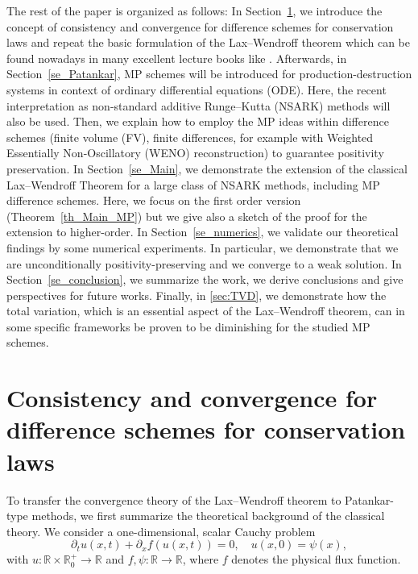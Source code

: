 \documentclass[final,11pt, times, linenumber, nopreprintline]{elsarticle}
\newcommand{\TI}[1]{{\color{red}#1}}
\newcommand{\PO}[1]{{\color{blue}#1}}
\newcommand{\R}{\mathbb{R}}
\newcommand{\bu}{ u}
\begin{document}
The rest of the paper is organized as follows: In Section~\ref{Se_preliminaries}, we introduce the concept of consistency and convergence for difference schemes for conservation laws and repeat the basic formulation of the Lax--Wendroff theorem which can be found nowadays in many excellent lecture books like \cite{leveque_numerical_1992, kroner_numerical_1997,godlewski_numerical_1996}.
Afterwards, in Section~\ref{se_Patankar}, MP schemes will be introduced for production-destruction systems in context of ordinary differential equations (ODE). Here, the recent interpretation as  non-standard additive Runge--Kutta (NSARK) methods \cite{NSARK} will also be used.
Then, we explain how to employ the MP ideas within difference schemes (finite volume (FV), finite differences, for example with Weighted Essentially Non-Oscillatory (WENO) reconstruction) to guarantee positivity preservation. 
In Section~\ref{se_Main}, we demonstrate the extension of the classical Lax--Wendroff Theorem for a large class of NSARK methods, including MP difference schemes. 
Here, we focus on the first order version (Theorem~\ref{th_Main_MP}) but we give also a sketch of the proof for the extension to higher-order. 
In Section~\ref{se_numerics}, we validate our theoretical findings by some numerical experiments.
In  particular, we demonstrate that we are unconditionally positivity-preserving and we converge to a weak solution. 
In Section~\ref{se_conclusion}, we summarize the work, we derive conclusions and give perspectives for future works. 
Finally, in \ref{sec:TVD}, we demonstrate how the total variation, which is an essential aspect of the Lax--Wendroff theorem, can in some specific frameworks be proven to be diminishing for the studied MP schemes. %



\section{Consistency and convergence for difference schemes for conservation laws }\label{Se_preliminaries}
To transfer the convergence theory of the Lax--Wendroff theorem to Patankar-type methods, we first summarize the theoretical background of the classical theory. We consider a one-dimensional, scalar Cauchy problem
\begin{equation}
	\partial_t \bu(x,t) + \partial_x f(u(x,t)) = 0, \quad \bu(x,0)=\psi(x)\label{eq:InitProb},
\end{equation}
with $\bu\colon \R\times \R^+_0\to \R$ and $f,\psi\colon \R\to \R$, where $f$ denotes the physical flux function.
\end{document}
